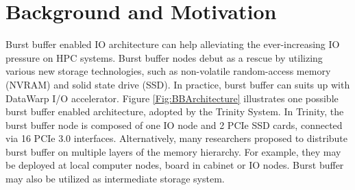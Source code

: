 \section{Background and Motivation}
\label{Sec:Background}

Burst buffer enabled IO architecture can help alleviating
the ever-increasing IO pressure on HPC systems.
Burst buffer nodes debut as a rescue by utilizing various new storage technologies,
such as non-volatile random-access memory (NVRAM) and solid state drive (SSD).
In practice, burst buffer can suits up with DataWarp I/O accelerator\cite{DataWarp}.
Figure \ref{Fig:BBArchitecture} illustrates one possible burst buffer enabled architecture,
adopted by the Trinity System\cite{TrinitySystem}.
In Trinity, the burst buffer node is composed of one IO node and 2 PCIe SSD cards,
connected via 16 PCIe 3.0 interfaces.
Alternatively, many researchers proposed to distribute burst buffer 
on multiple layers of the memory hierarchy\cite{Romanus:CORR:15}.
For example, they may be deployed at local computer nodes, board in cabinet or IO nodes.
Burst buffer may also be utilized as intermediate storage system.

